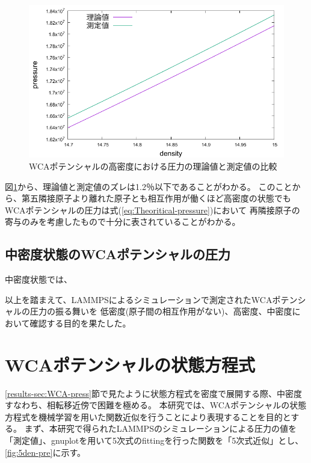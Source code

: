 \documentclass[titlepage]{jsreport}
\begin{document}
{{{\begin{figure}[htbp]
    \begin{center}
        \includegraphics[width=14cm]{fig/highden_compare:den-pre.pdf}
    \end{center}
    \caption{WCAポテンシャルの高密度における圧力の理論値と測定値の比較}
    \label{fig:highden_compare:den-pre}
\end{figure}

図\ref{fig:highden_compare:den-pre}から、理論値と測定値のズレは1.2％以下であることがわかる。
このことから、第五隣接原子より離れた原子とも相互作用が働くほど高密度の状態でもWCAポテンシャルの圧力は式(\ref{eq:Theoritical-pressure})において
再隣接原子の寄与のみを考慮したもので十分に表されていることがわかる。

\subsection{中密度状態のWCAポテンシャルの圧力}\label{results-sec:WCA-press-middle-density}
中密度状態では、

以上を踏まえて、LAMMPSによるシミュレーションで測定されたWCAポテンシャルの圧力の振る舞いを
低密度(原子間の相互作用がない)、高密度、中密度において確認する目的を果たした。



\section{WCAポテンシャルの状態方程式}\label{results-sec:WCA-equation}
\ref{results-sec:WCA-press}節で見たように状態方程式を密度で展開する際、中密度すなわち、相転移近傍で困難を極める。
本研究では、WCAポテンシャルの状態方程式を機械学習を用いた関数近似を行うことにより表現することを目的とする。
まず、本研究で得られたLAMMPSのシミュレーションによる圧力の値を「測定値」、gnuplotを用いて5次式のfittingを行った関数を「5次式近似」とし、
\ref{fig:5den-pre}に示す。


}}}
\end{document}
